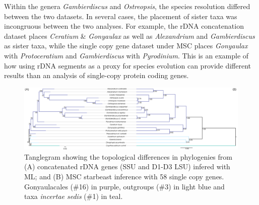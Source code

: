 \documentclass[12pt]{article}
\begin{document}
Within the genera \emph{Gambierdiscus} and \emph{Ostreopsis}, the species resolution differed between the two datasets. 
In several cases, the placement of sister taxa was incongruous between the two analyses. 
For example, the rDNA concatenation dataset places \emph{Ceratium} \& \emph{Gonyaulax} as well as \emph{Alexandrium} and \emph{Gambierdiscus} as sister taxa, while the single copy gene dataset under MSC places \emph{Gonyaulax} with \emph{Protoceratium} and \emph{Gambierdiscus} with \emph{Pyrodinium}. 
This is an example of how using rDNA segments as a proxy for species evolution can provide different results than an analysis of single-copy protein coding genes.

\begin{figure} 
\includegraphics[scale=.2]{figures/MSC-BI_vs_rDNA-ML.png} 
\caption{Tanglegram showing the topological differences in phylogenies from (A) concatenated rDNA genes (SSU and D1-D3 LSU) infered with ML; and (B) MSC starbeast inference with 58 single copy genes. Gonyaulacales (\#16) in purple, outgroups (\#3) in light blue and taxa \textit{incertae sedis} (\#1) in teal.} 
\label{fig:tanglerDNA}
\end{figure} 
\FloatBarrier
\end{document}
